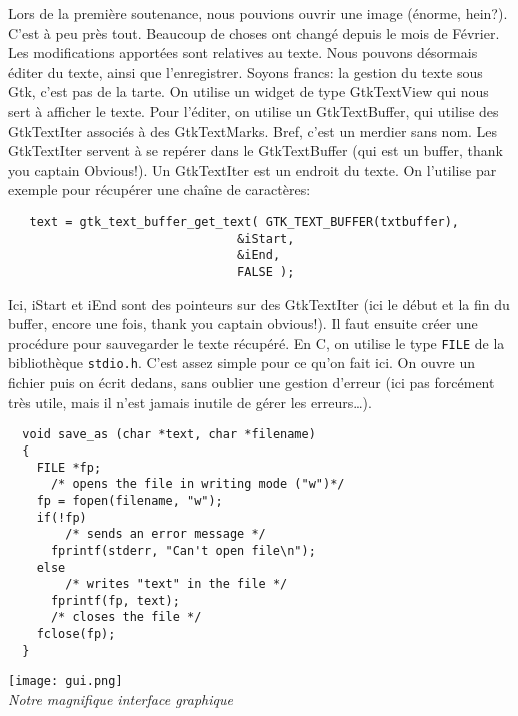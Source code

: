 \documentclass[a4paper,10pt]{report}
\begin{document}
Lors de la premi\`ere soutenance, nous pouvions ouvrir une image (\'enorme, hein?). C'est \`a peu pr\`es tout.
Beaucoup de choses ont chang\'e depuis le mois de F\'evrier.
Les modifications apport\'ees sont relatives au texte. Nous pouvons d\'esormais \'editer du texte, ainsi que l'enregistrer. Soyons francs: la gestion du texte sous Gtk, c'est pas de la tarte. On utilise un widget de type GtkTextView qui nous sert \`a afficher le texte. Pour l'\'editer, on utilise un GtkTextBuffer, qui utilise des GtkTextIter associ\'es \`a des GtkTextMarks. Bref, c'est un merdier sans nom.
Les GtkTextIter servent \`a se rep\'erer dans le GtkTextBuffer (qui est un buffer, thank you captain Obvious!). Un GtkTextIter est un endroit du texte. On l'utilise par exemple pour r\'ecup\'erer une cha\^ine de caract\`eres:
	\begin{lstlisting}
   text = gtk_text_buffer_get_text( GTK_TEXT_BUFFER(txtbuffer), 
	                            &iStart, 
	                            &iEnd, 
	                            FALSE );
	\end{lstlisting}
	Ici, iStart et iEnd sont des pointeurs sur des GtkTextIter (ici le d\'ebut et la fin du buffer, encore une fois, thank you captain obvious!).
	Il faut ensuite cr\'eer une proc\'edure pour sauvegarder le texte r\'ecup\'er\'e. En C, on utilise le type \verb!FILE! de la biblioth\`eque \verb!stdio.h!. C'est assez simple pour ce qu'on fait ici. On ouvre un fichier puis on \'ecrit dedans, sans oublier une gestion d'erreur (ici pas forc\'ement tr\`es utile, mais il n'est jamais inutile de g\'erer les erreurs\ldots).
	\begin{lstlisting}
  void save_as (char *text, char *filename)
  {
    FILE *fp;
      /* opens the file in writing mode ("w")*/
    fp = fopen(filename, "w");
    if(!fp)
        /* sends an error message */
      fprintf(stderr, "Can't open file\n");
    else
        /* writes "text" in the file */
      fprintf(fp, text);
      /* closes the file */
    fclose(fp);
  }
	\end{lstlisting}

	\begin{center}

		\texttt{[image: gui.png]}\\
		\caption{\emph{Notre magnifique interface graphique}}\\
	\end{center}
\end{document}

